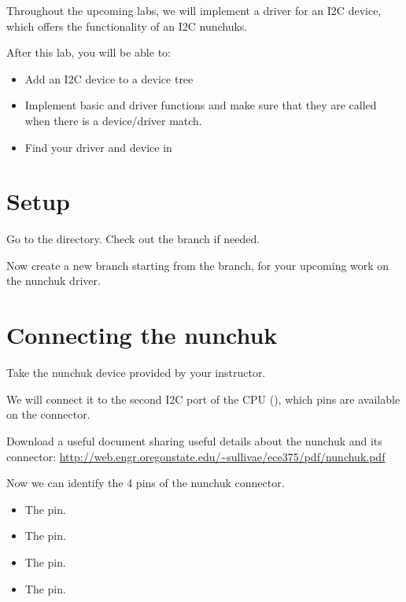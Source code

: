 
Throughout the upcoming labs, we will implement a driver for an I2C
device, which offers the functionality of an I2C nunchuks.

After this lab, you will be able to:

\begin{itemize}
\item Add an I2C device to a device tree
\item Implement basic  and  driver
functions and make sure that they are called when there is a
device/driver match.
\item Find your driver and device in 
\end{itemize}

\section{Setup}

Go to the  directory. Check out the
 branch if needed. 

Now create a new  branch starting from the
 branch,  for your upcoming work on the nunchuk
driver.  

\section{Connecting the nunchuk}

Take the nunchuk device provided by your instructor.

We will connect it to the second I2C port of the CPU (),
which pins are available on the  connector.

Download a useful document sharing useful details about the nunchuk
and its connector: 
\url{http://web.engr.oregonstate.edu/~sullivae/ece375/pdf/nunchuk.pdf}

Now we can identify the 4 pins of the nunchuk connector.

\begin{itemize}
\item The  pin.
\item The  pin.
\item The  pin.
\item The  pin.
\end{itemize}

